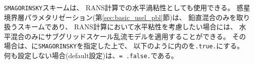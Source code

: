 \verb|SMAGORINSKY|スキームは、 RANS計算での水平渦粘性としても使用できる。
惑星境界層パラメタリゼーション(第\ref{sec:basic_usel_pbl}節)は、
鉛直混合のみを取り扱うスキームであり、
RANS計算において水平粘性を考慮したい場合には、
水平混合のみにサブグリッドスケール乱流モデルを適用することができる。
その場合は、に\verb|SMAGORINSKY|を指定した上で、
以下のように内のを\verb|.true.|にする。
何も設定しない場合(default設定)は、\verb|= .false.|である。
